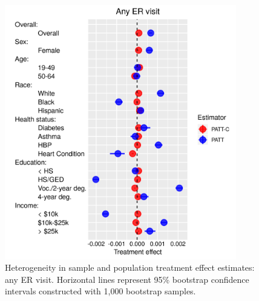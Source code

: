 \documentclass[hidelinks,12pt]{article}
\begin{document}
\begin{appendices}
\begin{figure}[htbp]
	\begin{center}
		\includegraphics[width = 0.9\textwidth]{any-visit-plot.png}
		\caption{Heterogeneity in sample and population treatment effect estimates: any ER visit. Horizontal lines represent 95\% bootstrap confidence intervals constructed with 1,000 bootstrap samples.\label{fig:any-visit-plot}}
	\end{center}
\end{figure}



\end{appendices}
\end{document}
